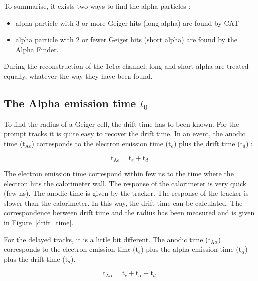 \documentclass[main.tex]{subfiles}
\begin{document}
\bigskip


\NI To summarise, it exists two ways to find the alpha particles :



\begin{itemize}
\item alpha particle with 3 or more Geiger hits (long alpha)  are found by CAT
\item alpha particle with 2 or fewer Geiger hits (short alpha) are found by the Alpha Finder.
\end{itemize} 


\noindent During the reconstruction of the 1e1$\alpha$ channel, long and short alpha are treated equally, whatever the way they have been found.

  
\subsection{The Alpha emission time $t_0$}


To find the radius of a Geiger cell, the drift time has to been known. For the prompt tracks it is quite easy to recover the drift time. In an event, the anodic time ($\text{t}_{\text{A}e}$) corresponds to the electron emission time ($ \text{t}_e$) plus the drift time ($\text{t}_d$) :


$$\text{t}_{\text{A}e} = \text{t}_e + \text{t}_d$$


\noindent The electron emission time correspond within few ns to the time where the electron hits the calorimeter wall. The response of the calorimeter is very quick (few ns). The anodic time is given by the tracker. The response of the tracker is slower than the calorimeter. In this way, the drift time can be calculated. The correspondence between drift time and the radius has been measured and is given in Figure~\ref{drift_time}.


\bigskip


\noindent For the delayed tracks, it is a little bit different. The anodic time ($\text{t}_{\text{A}\alpha}$) corresponds to the electron emission time ($ \text{t}_e$) plus the alpha emission time ($ \text{t}_\alpha$) plus the drift time ($\text{t}_d$). 


$$\text{t}_{\text{A}\alpha} = \text{t}_e + \text{t}_\alpha + \text{t}_d$$
\end{document}
